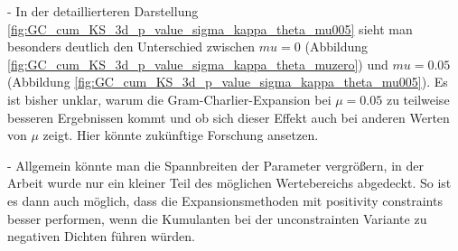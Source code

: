 - In der detaillierteren Darstellung \ref{fig:GC_cum_KS_3d_p_value_sigma_kappa_theta_mu005} sieht man besonders deutlich den Unterschied zwischen $mu=0$ (Abbildung \ref{fig:GC_cum_KS_3d_p_value_sigma_kappa_theta_muzero}) und $mu=0.05$ (Abbildung \ref{fig:GC_cum_KS_3d_p_value_sigma_kappa_theta_mu005}). Es ist bisher unklar, warum die Gram-Charlier-Expansion bei $\mu=0.05$ zu teilweise besseren Ergebnissen kommt und ob sich dieser Effekt auch bei anderen Werten von $\mu$ zeigt. Hier könnte zukünftige Forschung ansetzen.

- Allgemein könnte man die Spannbreiten der Parameter vergrößern, in der Arbeit wurde nur ein kleiner Teil des möglichen Wertebereichs abgedeckt. So ist es dann auch möglich, dass die Expansionsmethoden mit positivity constraints besser performen, wenn die Kumulanten bei der unconstrainten Variante zu negativen Dichten führen würden.
